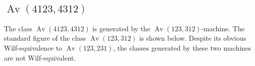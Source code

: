 \documentclass[10pt]{article}
\theoremstyle{plain}
\theoremstyle{definition}
\newcommand{\Av}{\operatorname{Av}}
\begin{document}
%
%
%

\subsection{$\Av(4123, 4312)$}

The class $\Av(4123,4312)$ is generated by the $\Av(123,312)$-machine. The standard figure of the class $\Av(123,312)$ is shown below. Despite its obvious Wilf-equivalence to $\Av(123,231)$, the classes generated by these two machines are not Wilf-equivalent.
\end{document}
